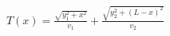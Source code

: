 \documentclass[preview]{standalone}
\begin{document}
\begin{align*}
T(x) = \frac{\sqrt{y_1^2 + x^2}}{v_1} + \frac{\sqrt{y_2^2 + (L-x)^2}}{v_2}
\end{align*}
\end{document}

